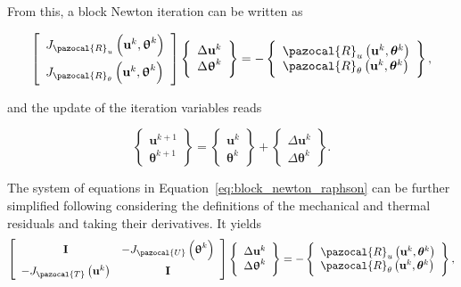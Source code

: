 From this, a block Newton iteration can be written as
\begin{highlight}
  \begin{equation} \label{eq:block_newton_raphson}
  \left[\begin{array}{l}
  J_{\pazocal{R}_{u}}\left(\mathbf u^k, \bm{\uptheta}^{k}\right) \\[7pt] J_{\pazocal{R}_{\theta}}\left(\mathbf{u}^{k}, \bm\uptheta^k\right)
  \end{array}\right]
  \left\{\begin{array}{c}\Delta \mathbf{u}^{k} \\ \Delta \bm{\uptheta}^{k}\end{array}\right\}
  =-\left\{\begin{array}{l}\pazocal{R}_{u}\left(\mathbf{u}^{k}, \boldsymbol{\theta}^{k}\right) \\ \pazocal{R}_{\theta}\left(\mathbf{u}^{k}, \boldsymbol{\theta}^{k}\right)\end{array}\right\},
  \end{equation}
\end{highlight}
and the update of the iteration variables reads
\begin{highlight}
  \begin{equation}
  \left\{\begin{array}{l}
  \mathbf{u}^{k+1} \\
  \boldsymbol{\theta}^{k+1}
  \end{array}\right\}=\left\{\begin{array}{l}
  \mathbf{u}^{k} \\
  \boldsymbol{\theta}^{k}
  \end{array}\right\}+\left\{\begin{array}{c}
  \Delta \mathbf{u}^{k} \\
  \Delta \boldsymbol{\theta}^{k}
  \end{array}\right\}.
  \end{equation}
\end{highlight}

The system of equations in Equation~\eqref{eq:block_newton_raphson} can be further simplified following \cite{degroote_development_2010} considering the definitions of the mechanical and thermal residuals and taking their derivatives.
It yields
\begin{equation}
\left[\begin{array}{cc}
\mathbf I & -J_{\pazocal{U}}\left(\bm{\uptheta}^{k}\right) \\[7pt]
-J_{\pazocal{T}}\left(\mathbf{u}^{k}\right) & \mathbf I
\end{array}\right]
\left\{\begin{array}{c}\Delta \mathbf{u}^{k} \\ \Delta \bm{\uptheta}^{k}\end{array}\right\}
=-\left\{\begin{array}{l}\pazocal{R}_{u}\left(\mathbf{u}^{k}, \boldsymbol{\theta}^{k}\right) \\ \pazocal{R}_{\theta}\left(\mathbf{u}^{k}, \boldsymbol{\theta}^{k}\right)\end{array}\right\},
\end{equation}

